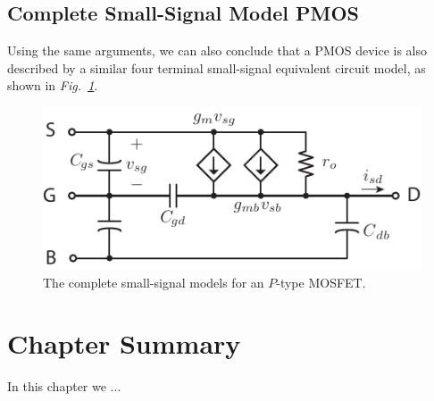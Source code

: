 \subsection{Complete Small-Signal Model PMOS}
Using the same arguments, we can also conclude that a PMOS device is also described by a similar four terminal small-signal equivalent circuit model, as shown in \emph{Fig.~\ref{fig:pmos4term_ac}}.
\begin{figure}[h]
\centering
\includegraphics[scale=1]{pmos4term_ac}
\caption{The complete small-signal models for an $P$-type MOSFET.}
\label{fig:pmos4term_ac}
\end{figure}
\newpage
\section{Chapter Summary}
In this chapter we ...
